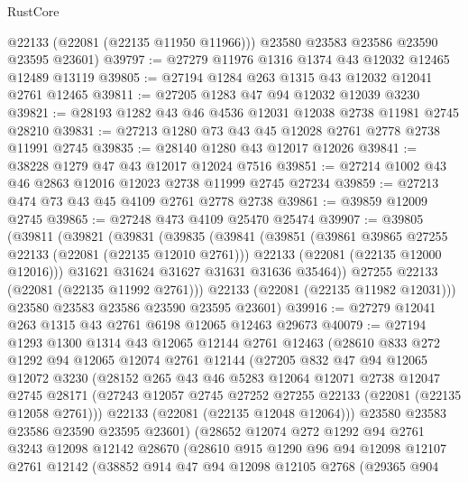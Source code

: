 \begin{lexlean}{RustCore}
\begin{coremodule}
        @22133
        (@22081 (@22135 @11950 @11966)))
      @23580
      @23583
      @23586
      @23590
      @23595
      @23601)
@39797 := @27279 @11976 @1316 @1374 @43 @12032 @12465 @12489 @13119
@39805 := @27194 @1284 @263 @1315 @43 @12032 @12041 @2761 @12465
@39811 := @27205 @1283 @47 @94 @12032 @12039 @3230
@39821 := @28193 @1282 @43 @46 @4536 @12031 @12038 @2738 @11981 @2745 @28210
@39831 := @27213 @1280 @73 @43 @45 @12028 @2761 @2778 @2738 @11991 @2745
@39835 := @28140 @1280 @43 @12017 @12026
@39841 := @38228 @1279 @47 @43 @12017 @12024 @7516
@39851 := @27214 @1002 @43 @46 @2863 @12016 @12023 @2738 @11999 @2745 @27234
@39859 := @27213 @474 @73 @43 @45 @4109 @2761 @2778 @2738
@39861 := @39859 @12009 @2745
@39865 := @27248 @473 @4109 @25470 @25474
@39907 := @39805
    (@39811
      (@39821
        (@39831
          (@39835
            (@39841
              (@39851
                (@39861 @39865 @27255 @22133 (@22081 (@22135 @12010 @2761)))
                @22133
                (@22081 (@22135 @12000 @12016)))
              @31621
              @31624
              @31627
              @31631
              @31636
              @35464))
          @27255
          @22133
          (@22081 (@22135 @11992 @2761)))
        @22133
        (@22081 (@22135 @11982 @12031)))
      @23580
      @23583
      @23586
      @23590
      @23595
      @23601)
@39916 := @27279 @12041 @263 @1315 @43 @2761 @6198 @12065 @12463 @29673
@40079 := @27194
    @1293
    @1300
    @1314
    @43
    @12065
    @12144
    @2761
    @12463
    (@28610
      @833
      @272
      @1292
      @94
      @12065
      @12074
      @2761
      @12144
      (@27205
        @832
        @47
        @94
        @12065
        @12072
        @3230
        (@28152
          @265
          @43
          @46
          @5283
          @12064
          @12071
          @2738
          @12047
          @2745
          @28171
          (@27243 @12057 @2745 @27252 @27255 @22133 (@22081 (@22135 @12058 @2761)))
          @22133
          (@22081 (@22135 @12048 @12064)))
        @23580
        @23583
        @23586
        @23590
        @23595
        @23601)
      (@28652
        @12074
        @272
        @1292
        @94
        @2761
        @3243
        @12098
        @12142
        @28670
        (@28610
          @915
          @1290
          @96
          @94
          @12098
          @12107
          @2761
          @12142
          (@38852
            @914
            @47
            @94
            @12098
            @12105
            @2768
            (@29365
              @904

\end{coremodule}
\end{lexlean}
